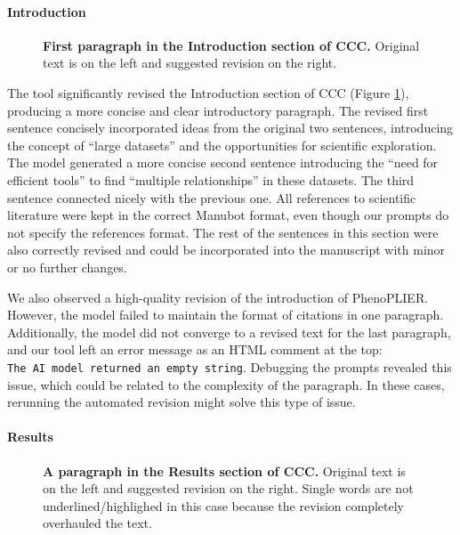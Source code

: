 \documentclass[
]{article}
\begin{document}
\hypertarget{introduction-1}{%
\paragraph{Introduction}\label{introduction-1}}

\begin{figure}
\hypertarget{fig:intro:ccc}{%
\centering

\caption{\textbf{First paragraph in the Introduction section of CCC.}
Original text is on the left and suggested revision on the right.}\label{fig:intro:ccc}
}
\end{figure}

The tool significantly revised the Introduction section of CCC (Figure \ref{fig:intro:ccc}), producing a more concise and clear introductory paragraph.
The revised first sentence concisely incorporated ideas from the original two sentences, introducing the concept of ``large datasets'' and the opportunities for scientific exploration.
The model generated a more concise second sentence introducing the ``need for efficient tools'' to find ``multiple relationships'' in these datasets.
The third sentence connected nicely with the previous one.
All references to scientific literature were kept in the correct Manubot format, even though our prompts do not specify the references format.
The rest of the sentences in this section were also correctly revised and could be incorporated into the manuscript with minor or no further changes.

We also observed a high-quality revision of the introduction of PhenoPLIER.
However, the model failed to maintain the format of citations in one paragraph.
Additionally, the model did not converge to a revised text for the last paragraph, and our tool left an error message as an HTML comment at the top: \texttt{The\ AI\ model\ returned\ an\ empty\ string}.
Debugging the prompts revealed this issue, which could be related to the complexity of the paragraph.
In these cases, rerunning the automated revision might solve this type of issue.

\hypertarget{results}{%
\paragraph{Results}\label{results}}

\begin{figure}
\hypertarget{fig:results:ccc}{%
\centering

\caption{\textbf{A paragraph in the Results section of CCC.}
Original text is on the left and suggested revision on the right.
Single words are not underlined/highlighed in this case because the revision completely overhauled the text.}\label{fig:results:ccc}
}
\end{figure}
\end{document}
